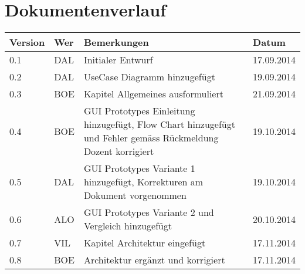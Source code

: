 \newpage
\section*{Dokumentenverlauf}
\begin{center}
	\begin{tabular}{  llp{9cm}l }
		\textbf{Version} & \textbf{Wer} & \textbf{Bemerkungen} & \textbf{Datum} \\\hline
		0.1 & DAL & Initialer Entwurf & 17.09.2014 \\
		0.2 & DAL & UseCase Diagramm hinzugefügt & 19.09.2014 \\
		0.3 & BOE & Kapitel Allgemeines ausformuliert & 21.09.2014 \\
		0.4 & BOE & GUI Prototypes Einleitung hinzugefügt, Flow Chart hinzugefügt und Fehler gemäss Rückmeldung Dozent korrigiert & 19.10.2014 \\
		0.5 & DAL & GUI Prototypes Variante 1 hinzugefügt, Korrekturen am Dokument vorgenommen & 19.10.2014 \\
		0.6 & ALO & GUI Prototypes Variante 2 und Vergleich hinzugefügt & 20.10.2014 \\
		0.7 & VIL & Kapitel Architektur eingefügt & 17.11.2014 \\
		0.8 & BOE & Architektur ergänzt und korrigiert & 17.11.2014 \\
	\end{tabular}
\end{center}
\newpage